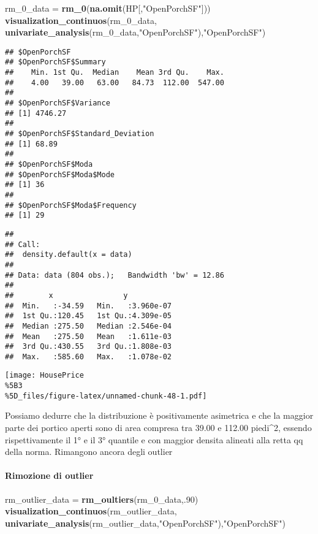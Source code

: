 \documentclass[
]{article}
\newenvironment{Shaded}{\begin{snugshade}}{\end{snugshade}}
\newcommand{\DecValTok}[1]{\textcolor[rgb]{0.00,0.00,0.81}{#1}}
\newcommand{\FunctionTok}[1]{\textcolor[rgb]{0.13,0.29,0.53}{\textbf{#1}}}
\newcommand{\NormalTok}[1]{#1}
\newcommand{\OtherTok}[1]{\textcolor[rgb]{0.56,0.35,0.01}{#1}}
\newcommand{\StringTok}[1]{\textcolor[rgb]{0.31,0.60,0.02}{#1}}
\begin{document}
\begin{Shaded}
\begin{Highlighting}[]
\NormalTok{rm\_0\_data }\OtherTok{=} \FunctionTok{rm\_0}\NormalTok{(}\FunctionTok{na.omit}\NormalTok{(HP[,}\StringTok{"OpenPorchSF"}\NormalTok{]))}
\FunctionTok{visualization\_continuos}\NormalTok{(rm\_0\_data, }\FunctionTok{univariate\_analysis}\NormalTok{(rm\_0\_data,}\StringTok{"OpenPorchSF"}\NormalTok{),}\StringTok{"OpenPorchSF"}\NormalTok{)}
\end{Highlighting}
\end{Shaded}

\begin{verbatim}
## $OpenPorchSF
## $OpenPorchSF$Summary
##    Min. 1st Qu.  Median    Mean 3rd Qu.    Max. 
##    4.00   39.00   63.00   84.73  112.00  547.00 
## 
## $OpenPorchSF$Variance
## [1] 4746.27
## 
## $OpenPorchSF$Standard_Deviation
## [1] 68.89
## 
## $OpenPorchSF$Moda
## $OpenPorchSF$Moda$Mode
## [1] 36
## 
## $OpenPorchSF$Moda$Frequency
## [1] 29
\end{verbatim}

\begin{verbatim}
## 
## Call:
##  density.default(x = data)
## 
## Data: data (804 obs.);   Bandwidth 'bw' = 12.86
## 
##        x                y            
##  Min.   :-34.59   Min.   :3.960e-07  
##  1st Qu.:120.45   1st Qu.:4.309e-05  
##  Median :275.50   Median :2.546e-04  
##  Mean   :275.50   Mean   :1.611e-03  
##  3rd Qu.:430.55   3rd Qu.:1.808e-03  
##  Max.   :585.60   Max.   :1.078e-02
\end{verbatim}

\texttt{[image: HousePrice\\\%5B3\\\%5D\_files/figure-latex/unnamed-chunk-48-1.pdf]}

Possiamo dedurre che la distribuzione è positivamente asimetrica e che
la maggior parte dei portico aperti sono di area compresa tra 39.00 e
112.00 piedi\^{}2, essendo rispettivamente il 1° e il 3° quantile e con
maggior densita alineati alla retta qq della norma. Rimangono ancora
degli outlier

\paragraph{Rimozione di outlier}\label{rimozione-di-outlier-11}

\begin{Shaded}
\begin{Highlighting}[]
\NormalTok{rm\_outlier\_data }\OtherTok{=} \FunctionTok{rm\_oultiers}\NormalTok{(rm\_0\_data,.}\DecValTok{90}\NormalTok{)}
\FunctionTok{visualization\_continuos}\NormalTok{(rm\_outlier\_data, }\FunctionTok{univariate\_analysis}\NormalTok{(rm\_outlier\_data,}\StringTok{"OpenPorchSF"}\NormalTok{),}\StringTok{"OpenPorchSF"}\NormalTok{)}
\end{Highlighting}
\end{Shaded}
\end{document}
